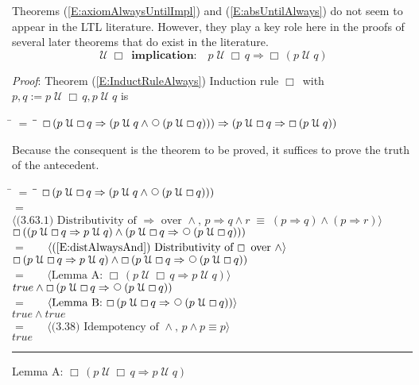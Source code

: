 \documentclass[12pt, fleqn, leqno]{article}
\newcommand{\lgap}{2pt}                             %
\newcommand{\mymathindent}{24pt}                    %
\newcommand{\equivs}{\ensuremath{\;\equiv\;}}       %
\newcommand{\impl}{\ensuremath{\Rightarrow}}        %
\newcommand{\Until}{\;\mathcal{U}\;}
\newcommand{\Next}{\;\,\text{\raisebox{3.5pt}{\circle{6}}}}
\newcommand{\Always}{\Box\,}
\newcommand{\myqed}{\rule[-.23ex]{1.2ex}{2.0ex}}
\newcommand{\myqedtab}{\hspace{384pt}}              %
\newcommand{\Gll} {\langle}                         %
\newcommand{\Ggg} {\rangle}                         %
\newcommand{\Hint}[1]     {\ \ \ $\Gll              \mbox{#1} \Ggg$ }   %
\begin{document}
Theorems (\ref{E:axiomAlwaysUntilImpl}) and (\ref{E:absUntilAlways}) do not seem to appear in the LTL literature.
However, they play a key role here in the proofs of several later theorems that do exist in the literature.
\begin{equation}\label{E:axiomAlwaysUntilImpl}
\textbf{$\Until\Always$ implication:}\quad p\Until \Always q\impl \Always (p\Until q)
\end{equation}

\emph{Proof}: Theorem (\ref{E:InductRuleAlways}) Induction rule $\Always$ with $p,q := p \Until \Always q, p \Until q$ is
\begin{tabbing}
\hspace{\mymathindent} \= $= \;$ \= \myqedtab \= \kill
\> \> $\Always (p \Until \Always q \impl (p \Until q \land \Next (p \Until \Always q))) \impl (p \Until \Always q \impl \Always (p \Until q))$
\end{tabbing}
Because the consequent is the theorem to be proved, it suffices to prove the truth of the antecedent.

\begin{tabbing}
\hspace{\mymathindent} \= $= \;$ \= \myqedtab \= \kill
  \> \>   $\Always (p \Until \Always q \impl (p \Until q \land \Next (p \Until \Always q)))$\\[\lgap]
   \> $=$  \>  \Hint{(3.63.1) Distributivity of $\impl$ over $\land$, $p\impl q\land r\equivs (p\impl q)\land (p\impl r)$}\\[\lgap]
   \> \>   $\Always ((p \Until \Always q \impl p \Until q) \land (p \Until \Always q \impl \Next (p \Until \Always q)))$\\[\lgap]
   \> $=$  \>  \Hint{(\ref{E:distAlwaysAnd}) Distributivity of $\Always$ over $\land$}\\[\lgap]
  \> \>   $\Always (p \Until \Always q \impl p \Until q) \land \Always (p \Until \Always q \impl \Next (p \Until \Always q))$\\[\lgap]
  \> $=$  \>  \Hint{Lemma A:  $\Always (p \Until \Always q \impl p \Until q)$}\\[\lgap]
  \> \>   $true \land \Always (p \Until \Always q \impl \Next (p \Until \Always q))$\\[\lgap]
   \> $=$  \>  \Hint{Lemma B:  $\Always (p \Until \Always q \impl \Next (p \Until \Always q))$}\\[\lgap]
  \> \>   $true \land true$\\[\lgap]
    \> $=$  \>  \Hint{(3.38) Idempotency of $\land$, $p\land p \equiv p$}\\[\lgap]
  \> \>   $true$ \quad \myqed
\end{tabbing}
Lemma A: $\Always (p \Until \Always q \impl p \Until q)$
\end{document}
